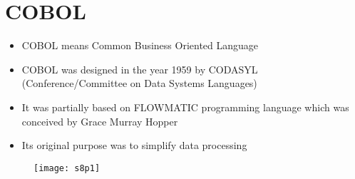 \documentclass{article}
\begin{document}
	\section{COBOL}
	\begin{itemize}
		\item COBOL means Common Business Oriented Language
		\item COBOL was  designed in the year 1959 by CODASYL (Conference/Committee on Data Systems Languages) 
		\item It was partially  based on FLOWMATIC programming language  which was conceived by Grace Murray Hopper 
		\item Its original purpose was to simplify data processing 
	\end{itemize}

\begin{figure}
	\texttt{[image: s8p1]}
	\caption{}
	\label{fig:s8p1}
\end{figure}
\end{document}
